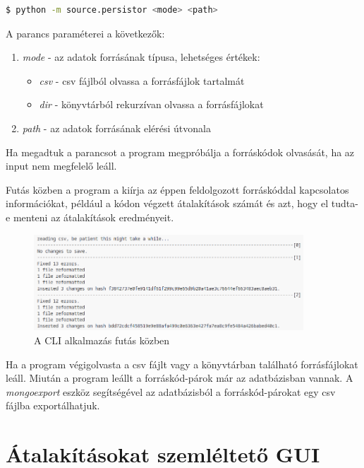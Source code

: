\begin{lstlisting}[language=bash]
	$ python -m source.persistor <mode> <path>
\end{lstlisting}

A parancs paraméterei a következők:

\begin{enumerate}
	\item\label{step:first} \emph{mode} - az adatok forrásának típusa,
	lehetséges értékek:
	\begin{itemize}
		\item \emph{csv} - csv fájlból olvassa a forrásfájlok tartalmát
		\item \emph{dir} - könyvtárból rekurzívan olvassa a forrásfájlokat
	\end{itemize}
	\item \emph{path} - az adatok forrásának elérési útvonala
\end{enumerate}

Ha megadtuk a parancsot a program megpróbálja a forráskódok olvasását,
ha az input nem megfelelő leáll.

Futás közben a program a kiírja az éppen feldolgozott forráskóddal kapcsolatos információkat,
például a kódon végzett átalakítások számát és azt, hogy el tudta-e menteni az átalakítások eredményeit.

\begin{figure}[H]
	\centering
	\includegraphics[width=0.9\textwidth,frame]{images/screenshots/log.png}
	\caption{A CLI alkalmazás futás közben}
\end{figure}

Ha a program végigolvasta a csv fájlt vagy a könyvtárban található forrásfájlokat leáll.
Miután a program leállt a forráskód-párok már az adatbázisban vannak.
A \emph{mongoexport} eszköz segítségével
az adatbázisból a forráskód-párokat egy csv fájlba exportálhatjuk.

\section{Átalakításokat szemléltető GUI}

